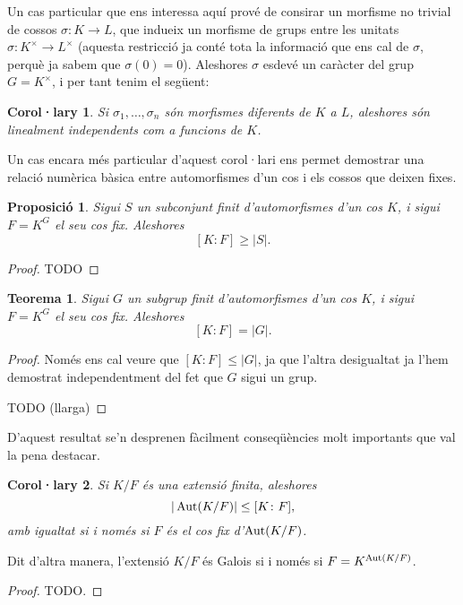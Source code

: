 \documentclass[
]{book}
\newtheorem{theorem}{Teorema}[chapter]
\newtheorem{corollary}{Corol·lary}[chapter]
\newtheorem{proposition}{Proposició}[chapter]
\theoremstyle{definition}
\theoremstyle{definition}
\theoremstyle{definition}
\theoremstyle{definition}
\theoremstyle{remark}
\begin{document}
Un cas particular que ens interessa aquí prové de consirar un morfisme no trivial de cossos \(\sigma\colon K\to L\),
que indueix un morfisme de grups entre les unitats \(\sigma\colon K^\times \to L^\times\) (aquesta restricció ja conté
tota la informació que ens cal de \(\sigma\), perquè ja sabem que \(\sigma(0)=0\)). Aleshores \(\sigma\) esdevé un caràcter
del grup \(G=K^\times\), i per tant tenim el següent:

\begin{corollary}
Si \(\sigma_1,\ldots,\sigma_n\) són morfismes diferents de \(K\) a \(L\), aleshores són linealment independents com a funcions de \(K\).
\end{corollary}

Un cas encara més particular d'aquest corol·lari ens permet demostrar una relació numèrica bàsica entre automorfismes d'un cos
i els cossos que deixen fixes.

\begin{proposition}
Sigui \(S\) un subconjunt finit d'automorfismes d'un cos \(K\), i sigui \(F=K^G\) el seu cos fix. Aleshores
\[
[K\colon F] \geq |S|.
\]
\end{proposition}

\begin{proof}
TODO
\end{proof}

\begin{theorem}
Sigui \(G\) un subgrup finit d'automorfismes d'un cos \(K\), i sigui \(F=K^G\) el seu cos fix. Aleshores
\[
[K\colon F] = |G|.
\]
\end{theorem}

\begin{proof}
Només ens cal veure que \([K\colon F] \leq |G|\), ja que l'altra desigualtat ja l'hem demostrat independentment
del fet que \(G\) sigui un grup.

TODO (llarga)
\end{proof}

D'aquest resultat se'n desprenen fàcilment conseqüències molt importants que val la pena destacar.

\begin{corollary}
Si \(K/F\) és una extensió finita, aleshores
\[
|\operatorname{Aut}(K/F)| \leq [K\colon F],
\]
amb igualtat si i només si \(F\) és el cos fix d'\(\operatorname{Aut}(K/F)\).
\end{corollary}

Dit d'altra manera, l'extensió \(K/F\) és Galois si i només si \(F=K^{\operatorname{Aut}(K/F)}\).

\begin{proof}
TODO.
\end{proof}
\end{document}
